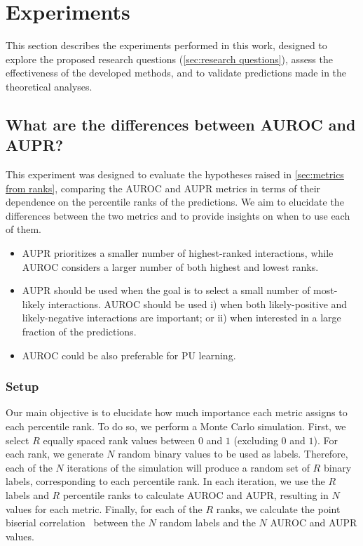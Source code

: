 \section{Experiments}
\label{sec:experiments}

This section describes the experiments performed in this work, designed to explore the proposed research questions (\autoref{sec:research questions}), assess the effectiveness of the developed methods, and to validate predictions made in the theoretical analyses.



\subsection{What are the differences between AUROC and AUPR?}
\label{sec:comparing auroc aupr}

This experiment was designed to evaluate the hypotheses raised in \autoref{sec:metrics from ranks}, comparing the AUROC and AUPR metrics in terms of their dependence on the percentile ranks of the predictions. We aim to elucidate the differences between the two metrics and to provide insights on when to use each of them.

\begin{mdframed}[frametitle={Key findings}]
    \begin{itemize}
        \item AUPR prioritizes a smaller number of highest-ranked interactions, while AUROC considers a larger number of both highest and lowest ranks.
        \item AUPR should be used when the goal is to select a small number of most-likely interactions. AUROC should be used i) when both likely-positive and likely-negative interactions are important; or ii) when interested in a large fraction of the predictions.
        \item AUROC could be also preferable for PU learning.
    \end{itemize}
\end{mdframed}

\subsubsection{Setup}

Our main objective is to elucidate how much importance each metric assigns to each percentile rank. To do so, we perform a Monte Carlo simulation. First, we select $R$ equally spaced rank values between $0$ and $1$ (excluding $0$ and $1$). For each rank, we generate $N$ random binary values to be used as labels. Therefore, each of the $N$ iterations of the simulation will produce a random set of $R$ binary labels, corresponding to each percentile rank. In each iteration, we use the $R$ labels and $R$ percentile ranks to calculate AUROC and AUPR, resulting in $N$ values for each metric. Finally, for each of the $R$ ranks, we calculate the point biserial correlation~\cite{kornbrot2014point} between the $N$ random labels and the $N$ AUROC and AUPR values.

